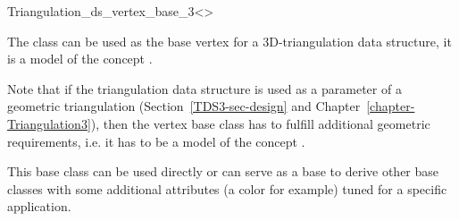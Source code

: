 

\begin{ccRefClass}{Triangulation_ds_vertex_base_3<>}

\ccDefinition

The class  can be used as the base vertex
for a 3D-triangulation data structure, it is a model of the concept
.

Note that if the triangulation data structure is used as a parameter of a
geometric triangulation (Section~\ref{TDS3-sec-design} and
Chapter~\ref{chapter-Triangulation3}), then the vertex base class has to
fulfill additional geometric requirements, i.e. it has to be a model of the
concept .

This base class can be used directly or can serve as a base to derive
other base classes with some additional attributes (a color for
example) tuned for a specific application.


\ccIsModel


\ccSeeAlso

\\
\\

\end{ccRefClass}
